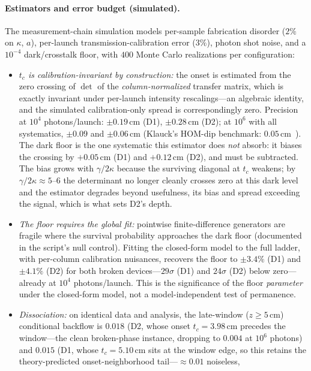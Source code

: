 \documentclass[11pt]{article}
\begin{document}
\paragraph{Estimators and error budget (simulated).} The
measurement-chain simulation models per-sample fabrication disorder
($2\%$ on $\kappa$, $a$), per-launch transmission-calibration error
($3\%$), photon shot noise, and a $10^{-4}$ dark/crosstalk floor,
with $400$ Monte Carlo realizations per configuration:
\begin{itemize}\setlength\itemsep{0pt}
\item \emph{$t_c$ is calibration-invariant by construction:} the onset
is estimated from the zero crossing of $\det$ of the
\emph{column-normalized} transfer matrix, which is exactly invariant
under per-launch intensity rescalings---an algebraic identity, and the
simulated calibration-only spread is correspondingly zero.
Precision at $10^4$ photons/launch: $\pm0.19\,$cm (D1),
$\pm0.28\,$cm (D2); at $10^6$ with all systematics, $\pm0.09$ and
$\pm0.06\,$cm (Klauck's HOM-dip benchmark:
$0.05\,$cm~\cite{Klauck2019}). The dark floor is the one systematic
this estimator does \emph{not} absorb: it biases the crossing by
$+0.05\,$cm (D1) and $+0.12\,$cm (D2), and must be subtracted. The
bias grows with $\gamma/2\kappa$ because the surviving diagonal at
$t_c$ weakens; by $\gamma/2\kappa\approx5$--$6$ the determinant no
longer cleanly crosses zero at this dark level and the estimator
degrades beyond usefulness, its bias and spread exceeding the signal,
which is what sets D2's depth.
\item \emph{The floor requires the global fit:} pointwise
finite-difference generators are fragile where the survival
probability approaches the dark floor (documented in the script's
null control). Fitting the closed-form model to the full ladder, with
per-column calibration nuisances, recovers the floor to $\pm3.4\%$
(D1) and $\pm4.1\%$ (D2)
for both broken devices---$29\sigma$ (D1) and $24\sigma$ (D2) below
zero---already at $10^4$ photons/launch. This is the significance of
the floor \emph{parameter} under the closed-form model, not a
model-independent test of permanence.
\item \emph{Dissociation:} on identical data and analysis, the
late-window ($z\ge5\,$cm) conditional backflow is $0.018$ (D2, whose
onset $t_c=3.98\,$cm precedes the window---the clean broken-phase
instance, dropping to $0.004$ at $10^6$ photons) and $0.015$ (D1, whose
$t_c=5.10\,$cm sits at the window edge, so this retains the
theory-predicted onset-neighborhood tail---$\approx0.01$ noiseless,

\end{itemize}
\end{document}
